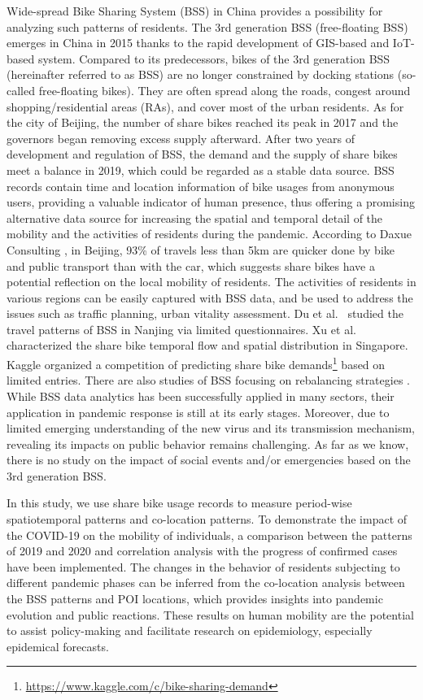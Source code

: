\documentclass[ijgi,submit,moreauthors,pdftex]{Definitions/mdpi}
\begin{document}
Wide-spread Bike Sharing System (BSS) in China provides a possibility for analyzing such patterns of residents.
The 3rd generation BSS (free-floating BSS) emerges in China in 2015 thanks to the rapid development of GIS-based and IoT-based system. 
Compared to its predecessors, bikes of the 3rd generation BSS (hereinafter referred to as BSS) are no longer constrained by docking stations (so-called free-floating bikes).
They are often spread along the roads, congest around shopping/residential areas (RAs), and cover most of the urban residents. 
As for the city of Beijing, the number of share bikes reached its peak in 2017 and the governors began removing excess supply afterward. 
After two years of development and regulation of BSS, the demand and the supply of share bikes meet a balance in 2019, which could be regarded as a stable data source.
BSS records contain time and location information of bike usages from anonymous users, providing a valuable indicator of human presence, thus offering a promising alternative data source for increasing the spatial and temporal detail of the mobility and the activities of residents during the pandemic.
According to Daxue Consulting \cite{bssmodel}, in Beijing, 93\% of travels less than 5km are quicker done by bike and public transport than with the car, which suggests share bikes have a potential reflection on the local mobility of residents.
The activities of residents in various regions can be easily captured with BSS data, and be used to address the issues such as traffic planning, urban vitality assessment.
Du et al.\ \cite{du2018better} studied the travel patterns of BSS in Nanjing via limited questionnaires.
Xu et al.\ \cite{xu2019unravel} characterized the share bike temporal flow and spatial distribution in Singapore.
Kaggle organized a competition of predicting share bike demands\footnote{\url{https://www.kaggle.com/c/bike-sharing-demand}} based on limited entries.
There are also studies of BSS focusing on rebalancing strategies \cite{pal2017free, ai2019deep,chen2016dynamic}.
While BSS data analytics has been successfully applied in many sectors, their application in pandemic response is still at its early stages.
Moreover, due to limited emerging understanding of the new virus and its transmission mechanism, revealing its impacts on public behavior remains challenging.
As far as we know, there is no study on the impact of social events and/or emergencies based on the 3rd generation BSS.

In this study, we use share bike usage records to measure period-wise spatiotemporal patterns and co-location patterns. 
To demonstrate the impact of the COVID-19 on the mobility of individuals, a comparison between the patterns of 2019 and 2020 and correlation analysis with the progress of confirmed cases have been implemented.
The changes in the behavior of residents subjecting to different pandemic phases can be inferred from the co-location analysis between the BSS patterns and POI locations, which provides insights into pandemic evolution and public reactions.
These results on human mobility are the potential to assist policy-making and facilitate research on epidemiology, especially epidemical forecasts.
\end{document}
